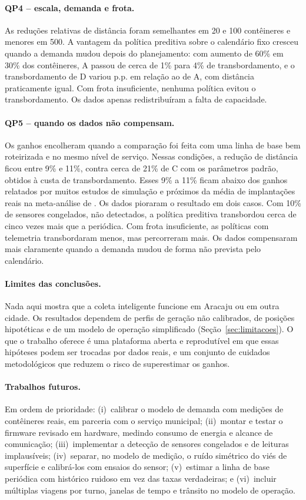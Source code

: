 \paragraph{QP4 -- escala, demanda e frota.}
As reduções relativas de distância foram semelhantes em 20 e 100 contêineres
e menores em 500. A vantagem da política preditiva sobre o calendário fixo
cresceu quando a demanda mudou depois do planejamento: com aumento de 60\% em
30\% dos contêineres, A passou de cerca de 1\% para 4\% de transbordamento, e
o transbordamento de D variou \DifEQMudancaRegimeTZXUSDvsAOv{} p.p. em relação ao de A, com distância
praticamente igual. Com frota insuficiente, nenhuma política evitou o
transbordamento. Os dados apenas redistribuíram a falta de capacidade.

\paragraph{QP5 -- quando os dados não compensam.}
Os ganhos encolheram quando a comparação foi feita com uma linha de base bem
roteirizada e no mesmo nível de serviço. Nessas condições, a redução de
distância ficou entre 9\% e 11\%, contra cerca de 21\% de C com os parâmetros
padrão, obtidos à custa de transbordamento. Esses 9\% a 11\% ficam abaixo dos
ganhos relatados por muitos estudos de simulação e próximos da média de
implantações reais na meta-análise de \cite{maciel2025impact}. Os dados
pioraram o resultado em dois casos. Com 10\% de sensores congelados, não
detectados, a política preditiva transbordou cerca de cinco vezes mais que a
periódica. Com frota insuficiente, as políticas com telemetria transbordaram
menos, mas percorreram mais. Os dados compensaram mais claramente quando a
demanda mudou de forma não prevista pelo calendário.

\paragraph{Limites das conclusões.}
Nada aqui mostra que a coleta inteligente funcione em Aracaju ou em outra
cidade. Os resultados dependem de perfis de geração não calibrados, de
posições hipotéticas e de um modelo de operação simplificado
(Seção~\ref{sec:limitacoes}). O que o trabalho oferece é uma plataforma
aberta e reprodutível em que essas hipóteses podem ser trocadas por dados
reais, e um conjunto de cuidados metodológicos que reduzem o risco de
superestimar os ganhos.

\paragraph{Trabalhos futuros.}
Em ordem de prioridade: (i)~calibrar o modelo de demanda com medições de
contêineres reais, em parceria com o serviço municipal; (ii)~montar e testar
o firmware revisado em hardware, medindo consumo de energia e alcance de
comunicação; (iii)~implementar a detecção de sensores congelados e de
leituras implausíveis; (iv)~separar, no modelo de medição, o ruído simétrico
do viés de superfície e calibrá-los com ensaios do sensor; (v)~estimar a
linha de base periódica com histórico ruidoso em vez das taxas verdadeiras; e
(vi)~incluir múltiplas viagens por turno, janelas de tempo e trânsito no
modelo de operação.
